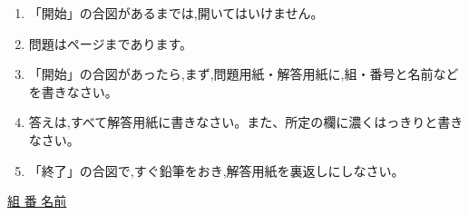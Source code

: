 \documentclass[
  12pt,a4paper,lualatex,ja=standard]{bxjsarticle}
\begin{document}
\centering
\begin{framed}
\begin{flushleft}
\begin{enumerate}
  \item {\large 「開始」の合図があるまでは,開いてはいけません。}

  \item {\large 問題は\pageref{LastPage}ページまであります。}

  \item {\large 「開始」の合図があったら,まず,問題用紙・解答用紙に,組・番号と名前などを書きなさい。}

  \item {\large 答えは,すべて解答用紙に書きなさい。また、所定の欄に濃くはっきりと書きなさい。}

  \item {\large 「終了」の合図で,すぐ鉛筆をおき,解答用紙を裏返しにしなさい。}
\end{enumerate}
\end{flushleft}
\end{framed}

\vspace{14mm}

\begin{center}
{\large \underline{\hspace{30mm}組 \hspace{30mm}番 \hspace{15mm} 名前 \hspace{60mm}}}
\end{center}

\newpage

　 \href{空白ページのための全角スペースあり。}{} \newpage

\pagestyle{plain}
\end{document}
